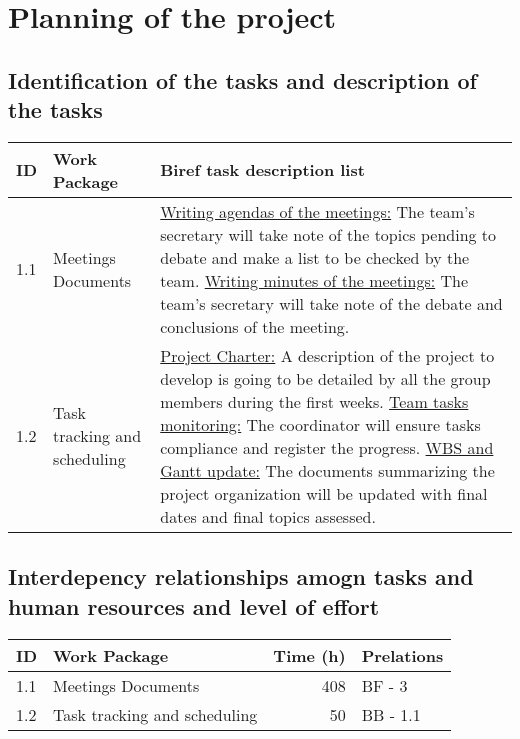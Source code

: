 \section{Planning of the project}


\subsection{Identification of the tasks and description of the tasks}
\begin{tabular}{ | l | p{4cm} | p{8cm} |}
\hline
ID & Work Package & Biref task description list \\ \hline

1.1 & Meetings Documents & 

\underline{Writing agendas of the meetings:} The team’s secretary will take note of the topics pending to debate and make a list to be checked by the team. \newline
\underline{Writing minutes of the meetings:} The team’s secretary will take note of the debate and conclusions of the meeting.\\ \hline

1.2 & Task tracking and scheduling & 

\underline{Project Charter:} 
A description of the project to develop is going to be detailed by all the group members during the first weeks. \newline
\underline{Team tasks monitoring:} 
The coordinator will ensure tasks compliance and register the progress.\newline
\underline{WBS and Gantt update:}
The documents summarizing the project organization will be updated with final dates and final topics assessed.
\\ \hline

\end{tabular}


\subsection{Interdepency relationships amogn tasks and human resources and level of effort}
\begin{tabular}{ | l | p{7cm} | r | p{3cm} | }
\hline
ID & Work Package & Time (h) & Prelations \\ \hline
1.1 & Meetings Documents & 408 & BF - 3 \\ \hline
1.2 & Task tracking and scheduling & 50 & BB - 1.1 \\ \hline

\end{tabular}


